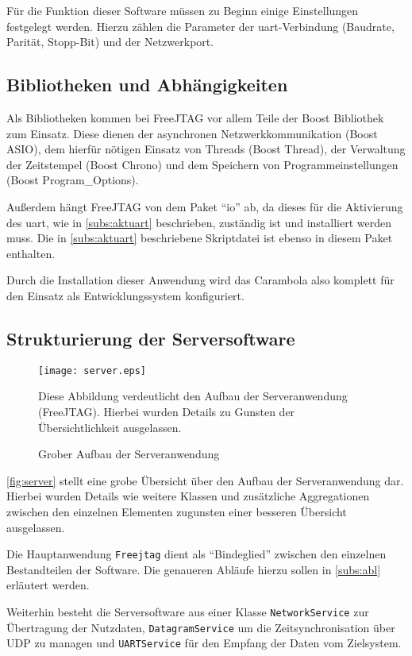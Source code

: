 Für die Funktion dieser Software müssen zu Beginn einige Einstellungen
festgelegt werden. Hierzu zählen die Parameter der \gls{uart}-Verbindung
(Baudrate, Parität, Stopp-Bit) und der Netzwerkport.

\subsection{Bibliotheken und Abhängigkeiten}
Als Bibliotheken kommen bei FreeJTAG vor allem Teile der Boost Bibliothek zum
Einsatz. Diese dienen der asynchronen Netzwerkkommunikation (Boost ASIO), dem
hierfür nötigen Einsatz von Threads (Boost Thread), der Verwaltung der
Zeitstempel (Boost Chrono) und dem Speichern von Programmeinstellungen (Boost
Program\_Options).

Außerdem hängt FreeJTAG von dem Paket "`io"' ab, da dieses für die Aktivierung
des \gls{uart}, wie in \autoref{subs:aktuart} beschrieben, zuständig ist und
installiert werden muss. Die in \autoref{subs:aktuart} beschriebene Skriptdatei
ist ebenso in diesem Paket enthalten. 

Durch die Installation dieser Anwendung wird das Carambola also komplett für den
Einsatz als Entwicklungssystem konfiguriert.

\subsection{Strukturierung der Serversoftware}
\begin{figure}[!ht]
\centering
\texttt{[image: server.eps]}
\caption{Grober Aufbau der Serveranwendung}{Diese Abbildung verdeutlicht den
Aufbau der Serveranwendung (FreeJTAG). Hierbei wurden Details zu Gunsten der
Übersichtlichkeit ausgelassen.}
\label{fig:server}
\end{figure}
\autoref{fig:server} stellt eine grobe Übersicht über den Aufbau der
Serveranwendung dar. Hierbei wurden Details wie weitere Klassen und
zusätzliche Aggregationen zwischen den einzelnen Elementen zugunsten einer
besseren Übersicht ausgelassen.

Die Hauptanwendung \texttt{Freejtag} dient als "`Bindeglied"' zwischen den
einzelnen Bestandteilen der Software. Die genaueren Abläufe hierzu sollen in
\autoref{subs:abl} erläutert werden.

Weiterhin besteht die Serversoftware aus einer Klasse
\texttt{NetworkService} zur Übertragung der Nutzdaten, \texttt{DatagramService}
um die Zeitsynchronisation über UDP zu managen und \texttt{UARTService} für den
Empfang der Daten vom Zielsystem.

